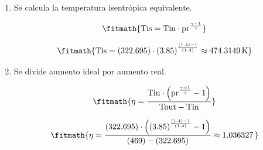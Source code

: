 \begin{enumerate}

\item Se calcula la temperatura isentrópica equivalente.

\[\fitmath{\mathrm{Tis}=\mathrm{Tin}\cdot {\mathrm{pr}}^{\frac{\gamma-1}{\gamma}}}\]

\[\fitmath{\mathrm{Tis}=(322.695)\cdot {(3.85)}^{\frac{(1.4)-1}{(1.4)}}\approx 474.3149\,\mathrm{K}}\]

\item Se divide aumento ideal por aumento real.

\[\fitmath{\eta=\frac{\mathrm{Tin}\cdot \left({\mathrm{pr}}^{\frac{\gamma-1}{\gamma}}-1\right)}{\mathrm{Tout}-\mathrm{Tin}}}\]

\[\fitmath{\eta=\frac{(322.695)\cdot \left({(3.85)}^{\frac{(1.4)-1}{(1.4)}}-1\right)}{(469)-(322.695)}\approx 1.036327\,}\]

\end{enumerate}
